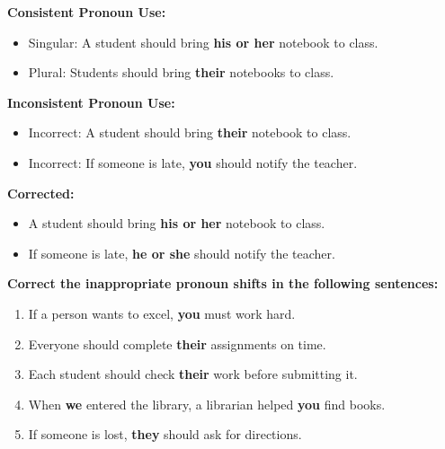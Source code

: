 \documentclass[12pt]{article}
\begin{document}
\begin{tcolorbox}[colframe=black!60, colback=white, 
coltitle=black, colbacktitle=black!15, fonttitle=\bfseries\Large, 
title=Examples of Pronoun Agreement, halign title=center, left=10pt, right=10pt, top=10pt, bottom=15pt]

\textbf{Consistent Pronoun Use:}
\begin{itemize}
    \item Singular: A student should bring \textbf{his or her} notebook to class.  
    \item Plural: Students should bring \textbf{their} notebooks to class.  
\end{itemize}

\textbf{Inconsistent Pronoun Use:}
\begin{itemize}
    \item Incorrect: A student should bring \textbf{their} notebook to class.  
    \item Incorrect: If someone is late, \textbf{you} should notify the teacher.  
\end{itemize}

\textbf{Corrected:}
\begin{itemize}
    \item A student should bring \textbf{his or her} notebook to class.  
    \item If someone is late, \textbf{he or she} should notify the teacher.  
\end{itemize}

\end{tcolorbox}

\vspace{1em}

\begin{tcolorbox}[colframe=black!60, colback=white, 
coltitle=black, colbacktitle=black!15, fonttitle=\bfseries\Large, 
title=Guided Practice, halign title=center, left=10pt, right=10pt, top=10pt, bottom=15pt]
\textbf{Correct the inappropriate pronoun shifts in the following sentences:}
\begin{enumerate}[itemsep=3em]
    \item If a person wants to excel, \textbf{you} must work hard.  
    \item Everyone should complete \textbf{their} assignments on time.  
    \item Each student should check \textbf{their} work before submitting it.  
    \item When \textbf{we} entered the library, a librarian helped \textbf{you} find books.  
    \item If someone is lost, \textbf{they} should ask for directions.  
\end{enumerate}
\end{tcolorbox}
\end{document}
